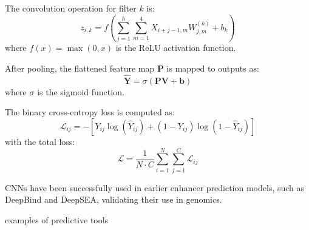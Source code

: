 The convolution operation for filter $k$ is:
\[
	z_{i,k} = f \left( \sum_{j=1}^{h} \sum_{m=1}^{4} X_{i+j-1, m} W_{j, m}^{(k)} + b_k \right)
\]
where $f(x) = \max(0, x)$ is the ReLU activation function.

After pooling, the flattened feature map $\mathbf{P}$ is mapped to outputs as:
\[
	\mathbf{\hat{Y}} = \sigma \left( \mathbf{P} \mathbf{V} + \mathbf{b} \right)
\]
where $\sigma$ is the sigmoid function.

The binary cross-entropy loss is computed as:
\[
	\mathcal{L}_{ij} = - \left[ Y_{ij} \log(\hat{Y}_{ij}) + (1 - Y_{ij}) \log(1 - \hat{Y}_{ij}) \right]
\]
with the total loss:
\[
	\mathcal{L} = \frac{1}{N \cdot C} \sum_{i=1}^{N} \sum_{j=1}^{C} \mathcal{L}_{ij}
\]

CNNs have been successfully used in earlier enhancer prediction models, such as DeepBind and DeepSEA, validating their use in genomics.




examples of predictive tools

